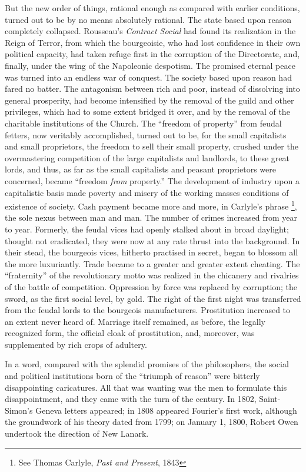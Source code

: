 But the new order of things, rational enough as compared with earlier
conditions, turned out to be by no means absolutely rational. The state based
upon reason completely collapsed. Rousseau's \emph{Contract Social} had found
its realization in the Reign of Terror, from which the bourgeoisie, who had lost
confidence in their own political capacity, had taken refuge first in the
corruption of the Directorate, and, finally, under the wing of the Napoleonic
despotism. The promised eternal peace was turned into an endless war of
conquest. The society based upon reason had fared no batter. The antagonism
between rich and poor, instead of dissolving into general prosperity, had become
intensified by the removal of the guild and other privileges, which had to some
extent bridged it over, and by the removal of the charitable institutions of the
Church. The ``freedom of property'' from feudal fetters, now veritably
accomplished, turned out to be, for the small capitalists and small proprietors,
the freedom to sell their small property, crushed under the overmastering
competition of the large capitalists and landlords, to these great lords, and
thus, as far as the small capitalists and peasant proprietors were concerned,
became ``freedom \emph{from} property.'' The development of industry upon a
capitalistic basis made poverty and misery of the working masses conditions of
existence of society. Cash payment became more and more, in Carlyle's phrase%
\footnote{See Thomas Carlyle, \emph{Past and Present}, 1843}, the sole nexus
between man and man. The number of crimes increased from year to year. Formerly,
the feudal vices had openly stalked about in broad daylight; thought not
eradicated, they were now at any rate thrust into the background. In their
stead, the bourgeois vices, hitherto practised in secret, began to blossom all
the more luxuriantly. Trade became to a greater and greater extent cheating. The
``fraternity'' of the revolutionary motto was realized in the chicanery and
rivalries of the battle of competition. Oppression by force was replaced by
corruption; the sword, as the first social level, by gold. The right of the
first night was transferred from the feudal lords to the bourgeois
manufacturers. Prostitution increased to an extent never heard of. Marriage
itself remained, as before, the legally recognized form, the official cloak of
prostitution, and, moreover, was supplemented by rich crops of adultery.

In a word, compared with the splendid promises of the philosophers, the social
and political institutions born of the ``triumph of reason'' were bitterly
disappointing caricatures. All that was wanting was the men to formulate this
disappointment, and they came with the turn of the century. In 1802,
Saint-Simon's Geneva letters appeared; in 1808 appeared Fourier's first work,
although the groundwork of his theory dated from 1799; on January 1, 1800,
Robert Owen undertook the direction of New Lanark.

